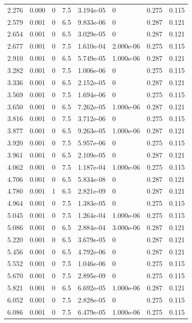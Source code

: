 \documentclass[preview]{standalone}
\begin{document}
{{\begin{tabular}{L{1.2cm}C{1.2cm} C{0.3cm}C{0.5cm} C{1.4cm}C{1.4cm} C{1.4cm}C{1.4cm}}
  2.276  &  0.000  & 0     & 7.5 &  3.194e-05  & 0  & 0.275 &  0.115   \\ 
  2.579  &  0.001  & 0     & 6.5 &  9.833e-06  & 0  & 0.287 &  0.121   \\ 
  2.654  &  0.001  & 0     & 6.5 &  3.029e-05  & 0  & 0.287 &  0.121   \\ 
  2.677  &  0.001  & 0     & 7.5 &  1.610e-04  & 2.000e-06  & 0.275 &  0.115   \\ 
  2.910  &  0.001  & 0     & 6.5 &  5.749e-05  & 1.000e-06  & 0.287 &  0.121   \\ 
  3.282  &  0.001  & 0     & 7.5 &  1.006e-06  & 0  & 0.275 &  0.115   \\ 
  3.336  &  0.001  & 0     & 6.5 &  2.152e-05  & 0  & 0.287 &  0.121   \\ 
  3.569  &  0.001  & 0     & 7.5 &  1.694e-06  & 0  & 0.275 &  0.115   \\ 
  3.650  &  0.001  & 0     & 6.5 &  7.262e-05  & 1.000e-06  & 0.287 &  0.121   \\ 
  3.816  &  0.001  & 0     & 7.5 &  3.712e-06  & 0  & 0.275 &  0.115   \\ 
  3.877  &  0.001  & 0     & 6.5 &  9.263e-05  & 1.000e-06  & 0.287 &  0.121   \\ 
  3.920  &  0.001  & 0     & 7.5 &  5.957e-06  & 0  & 0.275 &  0.115   \\ 
  3.961  &  0.001  & 0     & 6.5 &  2.109e-05  & 0  & 0.287 &  0.121   \\ 
  4.062  &  0.001  & 0     & 7.5 &  1.187e-04  & 1.000e-06  & 0.275 &  0.115   \\ 
  4.706  &  0.001  & 0     & 6.5 &  5.834e-08  & 0  & 0.287 &  0.121   \\ 
  4.780  &  0.001  & 1     & 6.5 &  2.821e-09  & 0  & 0.287 &  0.121   \\ 
  4.964  &  0.001  & 0     & 7.5 &  1.383e-05  & 0  & 0.275 &  0.115   \\ 
  5.045  &  0.001  & 0     & 7.5 &  1.264e-04  & 1.000e-06  & 0.275 &  0.115   \\ 
  5.086  &  0.001  & 0     & 6.5 &  2.884e-04  & 3.000e-06  & 0.287 &  0.121   \\ 
  5.220  &  0.001  & 0     & 6.5 &  3.679e-05  & 0  & 0.287 &  0.121   \\ 
  5.456  &  0.001  & 0     & 6.5 &  4.792e-06  & 0  & 0.287 &  0.121   \\ 
  5.552  &  0.001  & 0     & 7.5 &  1.046e-06  & 0  & 0.275 &  0.115   \\ 
  5.670  &  0.001  & 0     & 7.5 &  2.895e-09  & 0  & 0.275 &  0.115   \\ 
  5.821  &  0.001  & 0     & 6.5 &  6.692e-05  & 1.000e-06  & 0.287 &  0.121   \\ 
  6.052  &  0.001  & 0     & 7.5 &  2.828e-05  & 0  & 0.275 &  0.115   \\ 
  6.086  &  0.001  & 0     & 7.5 &  6.479e-05  & 1.000e-06  & 0.275 &  0.115   \\ 
\hline 
\end{tabular} 

}}
\end{document}
